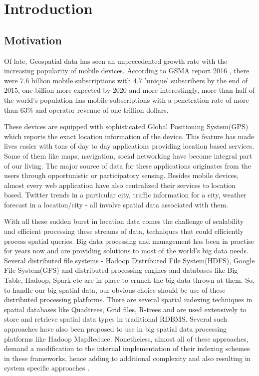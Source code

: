 \documentclass[article,type=msc,colorback,10pt,accentcolor=tud1d]{tudthesis}
\begin{document}
\setlength{ \parskip }{1em}
\tableofcontents 
\cleardoublepage 

\listoffigures
\clearpage
\appendix
\cleardoublepage 

	\hfill
  \section{Introduction}
  \hfill \break
 
		\subsection{Motivation}
		
		\par Of late, Geospatial data has seen an unprecedented growth rate with the increasing popularity of mobile devices. According to GSMA report 2016 \cite{GSMA_REPORT_2016}, there were 7.6 billion mobile subscriptions with 4.7 'unique' subscribers by the end of 2015, one billion more expected by 2020 and more interestingly, more than half of the world's population has mobile subscriptions with a penetration rate of more than 63\% and operator revenue of one trillion dollars.
		
		These devices are equipped with sophisticated Global Positioning System(GPS) which reports the exact location information of the device. This feature has made lives easier with tons of day to day applications providing location based services. Some of them like maps, navigation, social networking have become integral part of our living. The major source of data for these applications originates from the users through opportunistic or participatory sensing. Besides mobile devices, almost every web application have also centralized their services to location based. Twitter trends in a particular city, traffic information for a city, weather forecast in a location/city - all involve spatial data associated with them. 
		
		With all these sudden burst in location data comes the challenge of scalability and efficient processing these streams of data, techniques that could efficiently process spatial queries.  Big data processing and management has been in practise for years now and are providing solutions to most of the world's big data needs. Several distributed file systems - Hadoop Distributed File System(HDFS), Google File System(GFS) and distributed processing engines and databases like Big Table, Hadoop, Spark etc are in place to crunch the big data thrown at them. So, to handle our big-spatial-data, our obvious choice should be use of these distributed processing platforms. There are several spatial indexing techniques in spatial databases like Quadtrees, Grid files, R-trees and are used extensively to store and retrieve spatial data types in traditional RDBMS. Several such approaches have also been proposed to use in big spatial data processing platforms like Hadoop MapReduce. Nonetheless, almost all of these approaches, demand a modification to the internal implementation of their indexing schemes in these frameworks, hence adding to additional complexity and also resulting in  system specific approaches \cite{Lee:2014:ESQ:2666310.2666481} \cite{6691586}. 
		
\end{document}
